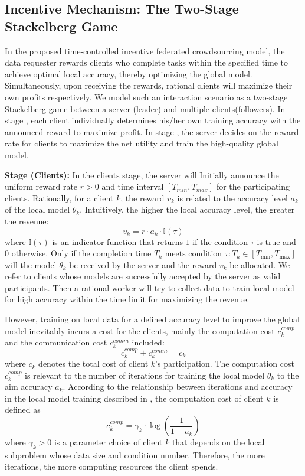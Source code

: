 \documentclass[final,1p,times]{elsarticle}
\begin{document}
\subsection{Incentive Mechanism: The Two-Stage Stackelberg Game}
In the proposed time-controlled incentive federated crowdsourcing model, the data requester rewards clients who complete tasks within the specified time to achieve optimal local accuracy, thereby optimizing the global model. Simultaneously, upon receiving the rewards, rational clients will maximize their own profits respectively. We model such an interaction scenario as a two-stage Stackelberg game between a server (leader) and multiple clients(followers). In stage \uppercase\expandafter{}, each client individually determines his/her own training accuracy with the announced reward to maximize profit. In stage \uppercase\expandafter{}, the server decides on the reward rate for clients to maximize the net utility and train the high-quality global model.

\textbf{Stage \uppercase\expandafter{} (Clients):} In the clients stage, the server will Initially announce the uniform reward rate $r>0$ and time interval $[T_{min},T_{max}]$ for the participating clients. Rationally, for a client $k$, the reward $v_k$ is related to the accuracy level $a_k$ of the local model $\theta_k$. Intuitively, the higher the local accuracy level, the greater the revenue:
\begin{equation}
	v_k = r\cdot a_k\cdot \mathbb{I}(\tau)
\end{equation}
where $\mathbb{I}(\tau)$ is an indicator function that returns $1$ if the condition $\tau$ is true and $0$ otherwise. Only if the completion time $T_k$ meets condition $\tau: T_k\in[T_{\min},T_{\max}]$ will the model $\theta_k$ be received by the server and the reward $v_k$ be allocated. We refer to clients whose models are successfully accepted by the server as valid participants. Then a rational worker will try to collect data to train local model for high accuracy within the time limit for maximizing the revenue. 

However, training on local data for a defined accuracy level to improve the global model inevitably incurs a cost for the clients, mainly the computation cost $c_k^{comp}$ and the communication cost $c_k^{comm}$ included:
\begin{equation}
	c_k^{comp} + c_k^{comm} = c_k
\end{equation}
where $c_k$ denotes the total cost of client $k$'s participation. The computation cost $c_k^{comp}$ is relevant to the number of iterations for training the local model $\theta_k$ to the aim accuracy $a_k$. According to the relationship between iterations and accuracy in the local model training described in \citep{pandey2020crowdsourcing}, the computation cost of client $k$ is defined as
\begin{equation}
	c_k^{comp} = \gamma_k\cdot \log(\frac{1}{1-a_k})
\end{equation}
where $\gamma_k>0$ is a parameter choice of client $k$ that depends on the local subproblem whose data size and condition number. Therefore, the more iterations, the more computing resources the client spends.
\end{document}
